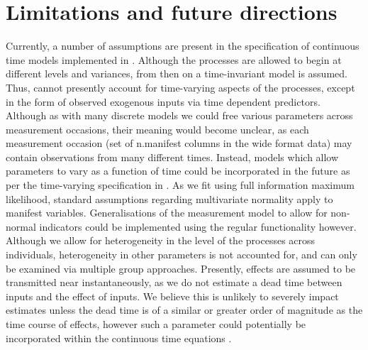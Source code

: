 \documentclass[nojss]{jss}\usepackage[]{graphicx}\usepackage[]{color}
\begin{document}
\section[Limitations and future directions]{Limitations and future directions} \label{sec:limitations}\nopagebreak
Currently, a number of assumptions are present in the specification of continuous time models implemented in . Although the processes are allowed to begin at different levels and variances, from then on a time-invariant model is assumed. Thus,  cannot presently account for time-varying aspects of the processes, except in the form of observed exogenous inputs via time dependent predictors. Although as with many discrete models we could free various parameters across measurement occasions, their meaning would become unclear, as each measurement occasion (set of n.manifest columns in the wide format data) may contain observations from many different times. Instead, models which allow parameters to vary as a function of time could be incorporated in the future as per the time-varying specification in \citet{oud2000continuous}.
As we fit using full information maximum likelihood, standard assumptions regarding multivariate normality apply to manifest variables. Generalisations of the measurement model to allow for non-normal indicators could be implemented using the regular  functionality however.
Although we allow for heterogeneity in the level of the processes across individuals, heterogeneity in other parameters is not accounted for, and can only be examined via multiple group approaches.
Presently, effects are assumed to be transmitted near instantaneously, as we do not estimate a dead time between inputs and the effect of inputs. We believe this is unlikely to severely impact estimates unless the dead time is of a similar or greater order of magnitude as the time course of effects, however such a parameter could potentially be incorporated within the continuous time equations \citep{richard2003timedelay}.
\end{document}
